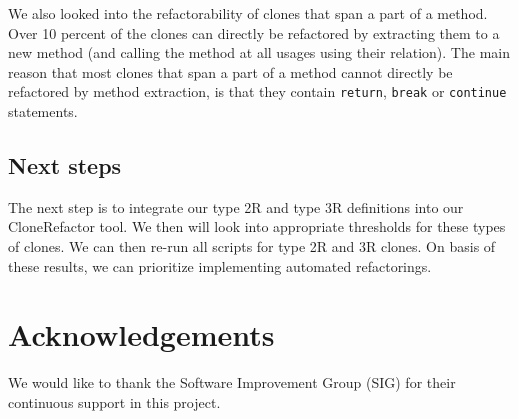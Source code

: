 \documentclass[a4paper]{article}
\begin{document}
We also looked into the refactorability of clones that span a part of a method. Over 10 percent of the clones can directly be refactored by extracting them to a new method (and calling the method at all usages using their relation). The main reason that most clones that span a part of a method cannot directly be refactored by method extraction, is that they contain \texttt{return}, \texttt{break} or \texttt{continue} statements.

\subsection{Next steps}
The next step is to integrate our type 2R and type 3R definitions into our CloneRefactor tool. We then will look into appropriate thresholds for these types of clones. We can then re-run all scripts for type 2R and 3R clones. On basis of these results, we can prioritize implementing automated refactorings.

\section*{Acknowledgements}
We would like to thank the Software Improvement Group (SIG) for their continuous support in this project.



\end{document}
